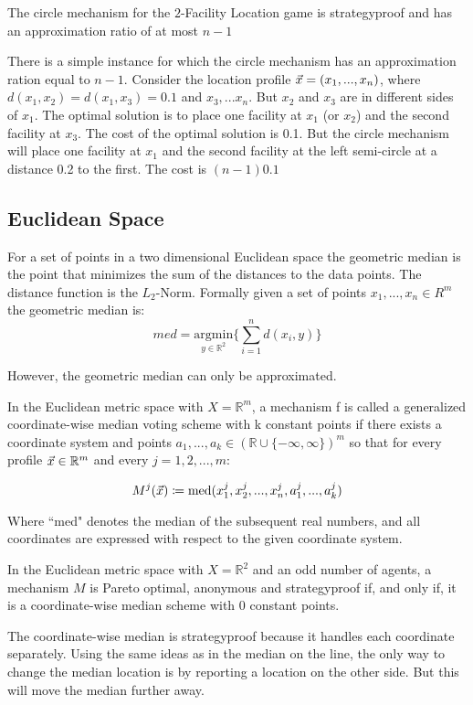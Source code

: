 \begin{theorem}\cite{Lu2010}
The circle mechanism for the $2$-Facility Location game is strategyproof and has an approximation ratio of at most $n-1$
\end{theorem}

There is a simple instance for which the circle mechanism has an approximation ration equal to $n-1$. Consider the location profile $\vec{x}=(x_1,...,x_n)$, where $d(x_1,x_2)=d(x_1,x_3)=0.1$ and $x_3,...x_n$. But $x_2$ and $x_3$ are in different sides of $x_1$. The optimal solution is to place one facility at $x_1$ (or $x_2$) and the second facility at $x_3$. The cost of the optimal solution is 0.1. But the circle mechanism will place one facility at $x_1$ and the second facility at the left semi-circle at a distance 0.2 to the first. The cost is $(n-1)0.1$

\subsection{Euclidean Space}

For a set of points in a two dimensional Euclidean space the geometric median is the point that minimizes the sum of the distances to the data points. The distance function is the $L_2$-Norm. Formally given a set of points $x_1,...,x_n\in R^m$ the geometric median is:
\[ med =  \underset{y\in\mathbb{R}^2}{\mathrm{argmin}}  \bigg\{ \sum_{i=1}^n d(x_i,y) \bigg\} \]


However, the geometric median can only be approximated. 


\begin{definition}
In the Euclidean metric space with $X = \mathbb{R}^m$, a mechanism f is called a generalized coordinate-wise median voting scheme with k constant points if there exists a coordinate system and points $a_1,...,a_k \in (\mathbb{R}\cup \{-\infty,\infty\})^m$ so that for every profile $\vec{x} \in \mathbb{R}^m$ and every $j=1,2,...,m$:

\[M^j(\vec{x}) \coloneqq \text{med}(x_1^j,x_2^j,...,x_n^j,a_1^j,...,a_k^j)\]

Where ``med" denotes the median of the subsequent real numbers, and all coordinates are expressed with respect to the given coordinate system. 

\end{definition}
 

\begin{lemma}\cite{Peters1992}
In the Euclidean metric space with $X=\mathbb{R}^2$ and an odd number of agents, a mechanism $M$ is Pareto optimal, anonymous and strategyproof if, and only if, it is a coordinate-wise median scheme with 0 constant points.
\end{lemma}
The coordinate-wise median is strategyproof because it handles each coordinate separately. Using the same ideas as in the median on the line, the only way to change the median location is by reporting a location on the other side. But this will move the median further away.   



